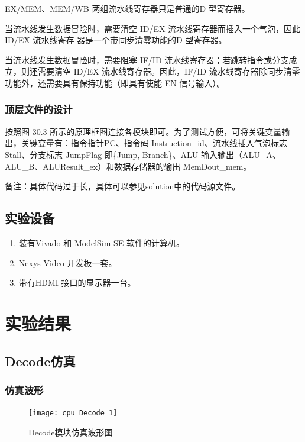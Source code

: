 \documentclass{../source/Experiment}
\begin{document}
        EX/MEM、MEM/WB 两组流水线寄存器只是普通的D 型寄存器。
        
        当流水线发生数据冒险时，需要清空 ID/EX 流水线寄存器而插入一个气泡，因此 ID/EX 流水线寄存
        器是一个带同步清零功能的D 型寄存器。
        
        当流水线发生数据冒险时，需要阻塞 IF/ID 流水线寄存器；若跳转指令或分支成立，则还需要清空
        ID/EX 流水线寄存器。因此，IF/ID 流水线寄存器除同步清零功能外，还需要具有保持功能（即具有使能
        EN 信号输入）。
        \subsubsection{顶层文件的设计}

        按照图 30.3 所示的原理框图连接各模块即可。为了测试方便，可将关键变量输出，关键变量有：指令指针PC、指令码 Instruction\_id、流水线插入气泡标志 Stall、分支标志 JumpFlag 即\{Jump, Branch\}、ALU 输入输出（ALU\_A、ALU\_B、ALUResult\_ex）和数据存储器的输出 MemDout\_mem。

        备注：具体代码过于长，具体可以参见solution中的代码源文件。

    \subsection{实验设备}
        \begin{enumerate}
            \item  装有Vivado 和 ModelSim SE 软件的计算机。
            \item  Nexys Video 开发板一套。
            \item  带有HDMI 接口的显示器一台。
        \end{enumerate}

    \section{实验结果}
        \subsection{Decode仿真}
            \subsubsection{仿真波形}
                \begin{figure}[H]
                    \centering
                    \texttt{[image: cpu\_Decode\_1]}
                    \caption{Decode模块仿真波形图}
                \end{figure}
\end{document}
